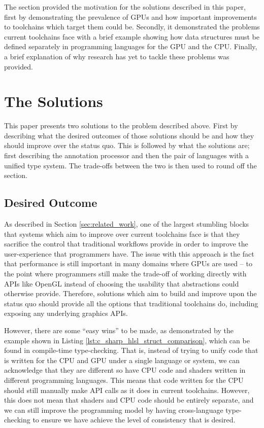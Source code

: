\documentclass[a4paper,12pt,twoside,openright]{report}
\begin{document}
The section provided the motivation for the solutions described in this paper,
first by demonstrating the prevalence of GPUs and how important improvements to
toolchains which target them could be. Secondly, it demonstrated the problems
current toolchains face with a brief example showing how data structures must be
defined separately in programming languages for the GPU and the CPU. Finally, a
brief explanation of why research has yet to tackle these problems was
provided.

\section{The Solutions}

This paper presents two solutions to the problem described above. First by
describing what the desired outcomes of those solutions should be and how they
should improve over the status quo. This is followed by what the solutions are;
first describing the annotation processor and then the pair of languages with a
unified type system. The trade-offs between the two is then used to round off
the section.

\subsection{Desired Outcome}

As described in Section \ref{sec:related_work}, one of the largest stumbling
blocks that systems which aim to improve over current toolchains face is that
they sacrifice the control that traditional workflows provide in order to
improve the user-experience that programmers have. The issue with this approach
is the fact that performance is still important in many domains where GPUs are
used -- to the point where programmers still make the trade-off of working
directly with APIs like OpenGL instead of choosing the usability that
abstractions could otherwise provide. Therefore, solutions which aim to build
and improve upon the status quo should provide all the options that traditional
toolchains do, including exposing any underlying graphics APIs.

However, there are some ``easy wins'' to be made, as demonstrated by the
example shown in Listing \ref{lst:c_sharp_hlsl_struct_comparison}, which can be
found in compile-time type-checking. That is, instead of trying to unify code
that is written for the CPU and GPU under a single language or system, we can
acknowledge that they are different so have CPU code and shaders written in
different programming languages. This means that code written for the CPU
should still manually make API calls as it does in current toolchains. However,
this does not mean that shaders and CPU code should be entirely separate, and
we can still improve the programming model by having cross-language
type-checking to ensure we have achieve the level of consistency that is
desired.
\end{document}
